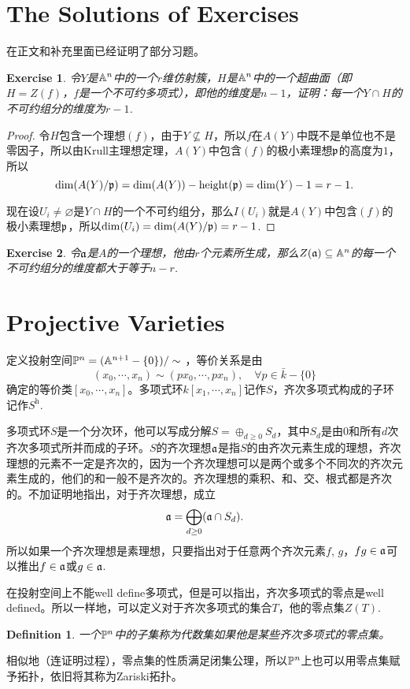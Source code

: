 \documentclass[9pt]{extarticle}
\theoremstyle{plain}%
\newtheorem{defi}{Definition}[section]%
\newtheorem{exe}{Exercise}[section]%
\begin{document}
\section*{The Solutions of Exercises}
在正文和补充里面已经证明了部分习题。
\setcounter{exe}{7}
\begin{exe}
令$Y$是$\mathbb{A}^n$中的一个$r$维仿射簇，$H$是$\mathbb{A}^n$中的一个超曲面（即$H=Z(f)$，$f$是一个不可约多项式），即他的维度是$n-1$，证明：每一个$Y\cap H$的不可约组分的维度为$r-1$.
\end{exe}
\begin{proof}
	令$H$包含一个理想$(f)$，由于$Y\nsubseteq H$，所以$f$在$A(Y)$中既不是单位也不是零因子，所以由Krull主理想定理，$A(Y)$中包含$(f)$的极小素理想$\mathfrak{p}$的高度为$1$，所以
	\[
		\dim (A(Y)/\mathfrak{p})=\dim(A(Y))-\operatorname{height}(\mathfrak{p})=\dim(Y)-1=r-1.
	\]

	现在设$U_i\neq \varnothing$是$Y\cap H$的一个不可约组分，那么$I(U_i)$就是$A(Y)$中包含$(f)$的极小素理想$\mathfrak{p}$，所以$\dim (U_i)=\dim (A(Y)/\mathfrak{p})=r-1$.
\end{proof}
\begin{exe}
令$\mathfrak{a}$是$A$的一个理想，他由$r$个元素所生成，那么$Z(\mathfrak{a})\subseteq \mathbb{A}^n$的每一个不可约组分的维度都大于等于$n-r$.
\end{exe}
\section{Projective Varieties}
定义投射空间$\mathbb{P}^n=(\mathbb{A}^{n+1}-\{0\})/\sim$ ，等价关系是由
\[
(x_0,\cdots,x_n)\sim (px_0,\cdots,px_n), \quad \forall p\in \bar{k}-\{0\}
\]
确定的等价类$[x_0,\cdots,x_n]$。多项式环$k[x_1,\cdots ,x_n]$记作$S$，齐次多项式构成的子环记作$S^{\mathrm{h}}$.

多项式环$S$是一个分次环，他可以写成分解$S=\oplus_{d\geq 0} S_d$，其中$S_d$是由$0$和所有$d$次齐次多项式所并而成的子环。$S$的齐次理想$\mathfrak{a}$是指$S$的由齐次元素生成的理想，齐次理想的元素不一定是齐次的，因为一个齐次理想可以是两个或多个不同次的齐次元素生成的，他们的和一般不是齐次的。齐次理想的乘积、和、交、根式都是齐次的。不加证明地指出，对于齐次理想，成立
\[
	\mathfrak{a}=\bigoplus_{d\geq 0} (\mathfrak{a}\cap S_d).
\]
所以如果一个齐次理想是素理想，只要指出对于任意两个齐次元素$f$, $g$，$fg\in \mathfrak{a}$可以推出$f\in \mathfrak{a}$或$g\in \mathfrak{a}$.

在投射空间上不能well define多项式，但是可以指出，齐次多项式的零点是well defined。所以一样地，可以定义对于齐次多项式的集合$T$，他的零点集$Z(T)$.

\begin{defi}
	一个$\mathbb{P}^n$中的子集称为代数集如果他是某些齐次多项式的零点集。
\end{defi}
相似地（连证明过程），零点集的性质满足闭集公理，所以$\mathbb{P}^n$上也可以用零点集赋予拓扑，依旧将其称为Zariski拓扑。
\end{document}
